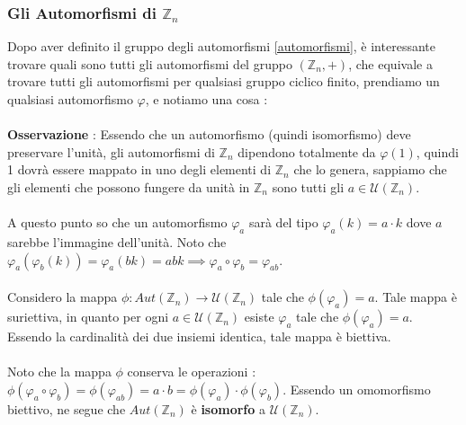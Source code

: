 \documentclass[12pt, letterpaper]{article}
\newcommand{\Z}{{\mathbb Z}}
\newcommand{\acc}{\\\hphantom{}\\}
\begin{document}
\subsubsection{Gli Automorfismi di \(\Z_n\)}
Dopo aver definito il gruppo degli automorfismi \ref{automorfismi}, è interessante trovare quali sono tutti gli 
automorfismi del gruppo \((\Z_n,+)\), che equivale a trovare tutti gli automorfismi per qualsiasi gruppo 
ciclico finito, prendiamo un qualsiasi automorfismo \(\varphi\), e notiamo una cosa :\\\hphantom{}\\      
\textbf{Osservazione} : Essendo che un automorfismo (quindi isomorfismo) deve preservare 
l'unità, gli automorfismi di \(\Z_n\) dipendono totalmente da \(\varphi(1)\), quindi 1 dovrà essere 
mappato in uno degli elementi di \(\Z_n\) che lo genera, sappiamo che gli elementi che possono 
fungere da unità in \(\Z_n\) sono tutti gli \(a\in\mathcal{U}(\Z_n)\).
\acc    
A questo punto so che un automorfismo \(\varphi_a\) sarà del tipo \(\varphi_a(k)=a\cdot k\) dove \(a\) sarebbe 
l'immagine dell'unità. Noto che \(\varphi_a(\varphi_b(k))=\varphi_a(bk)=abk\implies \varphi_a\circ \varphi_b=\varphi_{ab}\).\acc 
Considero la mappa \(\phi:Aut(\Z_n)\rightarrow\mathcal{U}(\Z_n)\) tale che \(\phi(\varphi_a)=a\). Tale mappa è 
suriettiva, in quanto per ogni \(a\in \mathcal{U}(\Z_n)\) esiste \(\varphi_a\) tale che \(\phi(\varphi_a)=a\). Essendo 
la cardinalità dei due insiemi identica, tale mappa è biettiva.\acc 
Noto che la mappa \(\phi\) conserva le operazioni : \(\phi(\varphi_a\circ \varphi_b)=\phi(\varphi_{ab})=a\cdot b=
\phi(\varphi_a)\cdot\phi(\varphi_b)\). Essendo un omomorfismo biettivo, ne segue che \(Aut(\Z_n)\) è \textbf{isomorfo} a 
\(\mathcal{U}(\Z_n)\).
\end{document}
